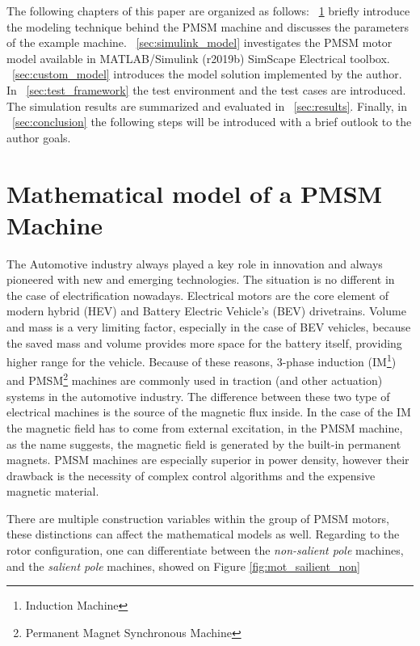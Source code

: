 \documentclass[twoside,b5paper,10pt]{article}
\begin{document}
The following chapters of this paper are organized as follows: \sectionname~\ref{sec:matPMSM} briefly introduce the modeling technique behind the PMSM machine and discusses the parameters of the example machine. \sectionname~\ref{sec:simulink_model} investigates the PMSM motor model available in MATLAB/Simulink (r2019b) SimScape Electrical toolbox. \sectionname~\ref{sec:custom_model} introduces the model solution implemented by the author. In \sectionname~\ref{sec:test_framework} the test environment and the test cases are introduced. The simulation results are summarized and evaluated in \sectionname~\ref{sec:results}. Finally, in \sectionname~\ref{sec:conclusion} the following steps will be introduced with a brief outlook to the author goals. 


\section{Mathematical model of a PMSM Machine}
\label{sec:matPMSM}

The Automotive industry always played a key role in innovation and always pioneered with new and emerging technologies. The situation is no different in the case of electrification nowadays. Electrical motors are the core element of modern hybrid (HEV) and Battery Electric Vehicle's (BEV) drivetrains. Volume and mass is a very limiting factor, especially in the case of BEV vehicles, because the saved mass and volume provides more space for the battery itself, providing higher range for the vehicle. Because of these reasons, 3-phase induction (IM\footnote{Induction Machine}) and PMSM\footnote{Permanent Magnet Synchronous Machine} machines are commonly used in traction (and other actuation) systems in the automotive industry. The difference between these two type of electrical machines is the source of the magnetic flux inside. In the case of the IM the magnetic field has to come from external excitation, in the PMSM machine, as the name suggests, the magnetic field is generated by the built-in permanent magnets. PMSM machines are especially superior in power density, however their drawback is the necessity of complex control algorithms and the expensive magnetic material.

There are multiple construction variables within the group of PMSM motors, these distinctions can affect the mathematical models as well. Regarding to the rotor configuration, one can differentiate between the \emph{non-salient pole} machines, and the \emph{salient pole} machines, showed on Figure \ref{fig:mot_sailient_non}
\end{document}
